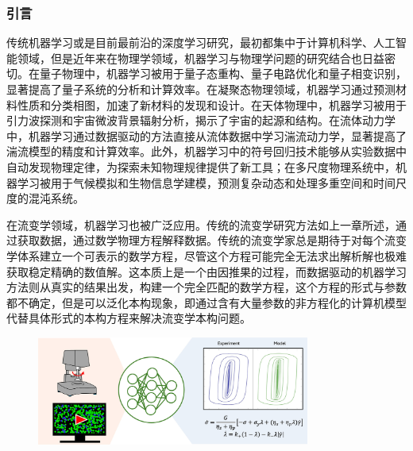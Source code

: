 \subsubsection{引言}
传统机器学习或是目前最前沿的深度学习研究，最初都集中于计算机科学、人工智能领域，但是近年来在物理学领域，机器学习与物理学问题的研究结合也日益密切。在量子物理中，机器学习被用于量子态重构、量子电路优化和量子相变识别，显著提高了量子系统的分析和计算效率。在凝聚态物理领域，机器学习通过预测材料性质和分类相图，加速了新材料的发现和设计。在天体物理中，机器学习被用于引力波探测和宇宙微波背景辐射分析，揭示了宇宙的起源和结构。在流体动力学中，机器学习通过数据驱动的方法直接从流体数据中学习湍流动力学，显著提高了湍流模型的精度和计算效率。此外，机器学习中的符号回归技术能够从实验数据中自动发现物理定律，为探索未知物理规律提供了新工具；在多尺度物理系统中，机器学习被用于气候模拟和生物信息学建模，预测复杂动态和处理多重空间和时间尺度的混沌系统。

在流变学领域，机器学习也被广泛应用。传统的流变学研究方法如上一章所述，通过获取数据，通过数学物理方程解释数据。传统的流变学家总是期待于对每个流变学体系建立一个可表示的数学方程，尽管这个方程可能完全无法求出解析解也极难获取稳定精确的数值解。这本质上是一个由因推果的过程，而数据驱动的机器学习方法则从真实的结果出发，构建一个完全匹配的数学方程，这个方程的形式与参数都不确定，但是可以泛化本构现象，即通过含有大量参数的非方程化的计算机模型代替具体形式的本构方程来解决流变学本构问题。
\begin{figure}[htbp]
	\centering
	\includegraphics[width=0.8\textwidth]{Fig/datadrivenintro.jpg}
\end{figure}

